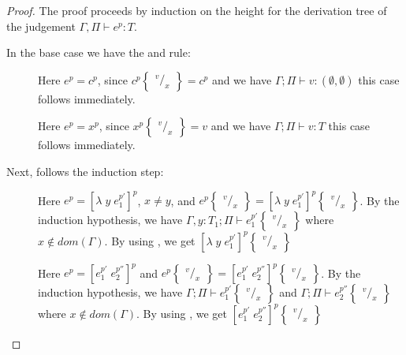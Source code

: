 \documentclass[../../master.tex]{subfiles}
\begin{document}
\begin{proof}
	The proof proceeds by induction on the height for the derivation tree of the judgement $\Gamma,\Pi\vdash e^p:T$.
	
	In the base case we have the  and  rule:
	\begin{description}
		\item[] Here $e^p=c^p$, since $c^p\begin{Bmatrix} ^v/_x \end{Bmatrix}=c^p$ and we have $\Gamma;\Pi\vdash v:(\emptyset,\emptyset)$ this case follows immediately.

		\item[] Here $e^p=x^p$, since $x^p\begin{Bmatrix} ^v/_x \end{Bmatrix}=v$ and we have $\Gamma;\Pi\vdash v:T$ this case follows immediately.
	\end{description}

	Next, follows the induction step:
	\begin{description}
		\item[] Here $e^p=[\lambda\;y\;e_1^{p'}]^p$, $x\neq y$, and $e^p\begin{Bmatrix} ^v/_x \end{Bmatrix}=[\lambda\;y\;e_1^{p'}]^p\begin{Bmatrix} ^v/_x \end{Bmatrix}$.
			By the induction hypothesis, we have $\Gamma,y:T_1;\Pi\vdash e_1^{p'}\begin{Bmatrix} ^v/_x \end{Bmatrix}$ where $x\notin dom(\Gamma)$.
			By using , we get $[\lambda\;y\;e_1^{p'}]^p\begin{Bmatrix} ^v/_x \end{Bmatrix}$

		\item[] Here $e^p=[e_1^{p'}\;e_2^{p''}]^p$ and $e^p\begin{Bmatrix} ^v/_x \end{Bmatrix}=[e_1^{p'}\;e_2^{p''}]^p\begin{Bmatrix} ^v/_x \end{Bmatrix}$.
			By the induction hypothesis, we have $\Gamma;\Pi\vdash e_1^{p'}\begin{Bmatrix} ^v/_x \end{Bmatrix}$ and $\Gamma;\Pi\vdash e_2^{p''}\begin{Bmatrix} ^v/_x \end{Bmatrix}$ where $x\notin dom(\Gamma)$.
			By using , we get $[e_1^{p'}\;e_2^{p''}]^p\begin{Bmatrix} ^v/_x \end{Bmatrix}$


\end{description}
\end{proof}
\end{document}
